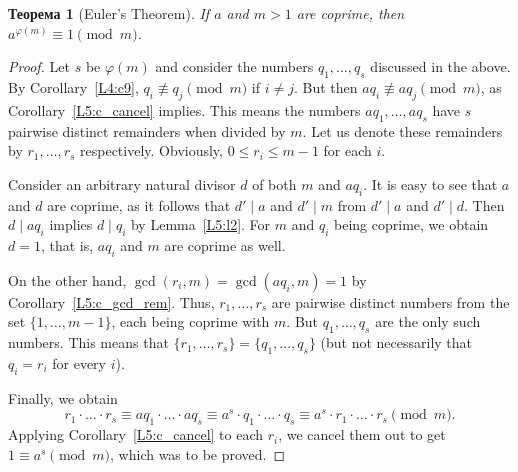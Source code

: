 \documentclass[12pt,notitlepage]{article}
\theoremstyle{plain}
\newtheorem{thm}{Теорема}[section]
\theoremstyle{definition}
\theoremstyle{plain}
\renewcommand{\phi}{\varphi}
\newcommand{\1}{\mathbf{1}}
\newcommand{\0}{\mathbf{0}}
\newcommand{\dvd}{\mathop{\mid}}
\begin{document}
\begin{thm}[Euler's Theorem]
	If $a$ and $m > 1$ are coprime, then $a^{\phi(m)} \equiv 1 \pmod m$.
\end{thm}
\begin{proof}
	Let $s$ be $\phi(m)$ and consider the numbers $q_1, \ldots, q_s$ discussed in the above. By Corollary~\ref{L4:c9}, $q_i \not\equiv q_j \pmod m$ if $i \neq j$. But then $a q_i \not\equiv a q_j \pmod m$, as Corollary~\ref{L5:c_cancel} implies. This means the numbers $a q_1, \ldots, a q_s$ have $s$ pairwise distinct remainders when divided by $m$. Let us denote these remainders by $r_1,\ldots, r_s$ respectively. Obviously, $0 \leq r_i \leq m - 1$ for each $i$.
	
	Consider an arbitrary natural divisor $d$ of both $m$ and $a q_i$. It is easy to see that $a$ and $d$ are coprime, as it follows that $d' \dvd a$ and $d' \dvd m$ from $d' \dvd  a$ and $d' \dvd d$. Then $d \dvd a q_i$ implies $d \dvd q_i$ by Lemma~\ref{L5:l2}. For $m$ and $q_i$ being coprime, we obtain $d = 1$, that is, $a q_i$ and $m$ are coprime as well. 
	
	On the other hand, $\gcd(r_i, m) = \gcd(a q_i, m) = 1$ by Corollary~\ref{L5:c_gcd_rem}. Thus, $r_1, \ldots, r_s$ are pairwise distinct numbers from the set $\{1,\ldots, m-1\}$, each being coprime with $m$. But $q_1, \ldots, q_s$ are the only such numbers. This means that $\{r_1, \ldots, r_s \} = \{q_1, \ldots, q_s\}$ (but not necessarily that $q_i = r_i$ for every $i$).
	
	Finally, we obtain
	$$r_1\cdot \ldots \cdot r_s \equiv a q_1 \cdot \ldots \cdot a q_s \equiv a^s \cdot q_1 \cdot \ldots \cdot q_s \equiv a^s \cdot r_1 \cdot \ldots \cdot r_s \pmod m.$$
	Applying Corollary~\ref{L5:c_cancel} to each $r_i$, we cancel them out to get $1 \equiv a^s \pmod m$, which was to be proved.
\end{proof}
\end{document}
